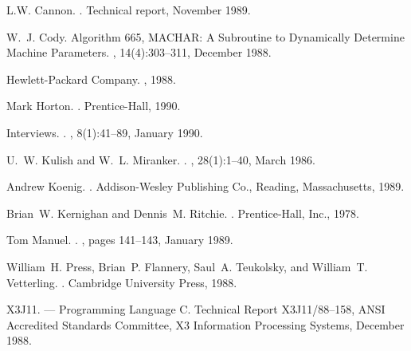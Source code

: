 \begin{thebibliography}{PFTV88}

L.W. Cannon.
.
\newblock Technical report, November 1989.

W.~J. Cody.
\newblock Algorithm 665, {MACHAR: A Subroutine to Dynamically Determine Machine
  Parameters}.
, 14(4):303--311,
  December 1988.

Hewlett-Packard Company.
, 1988.

Mark Horton.
.
\newblock Prentice-Hall, 1990.

Interviews.
.
, 8(1):41--89, January 1990.

U.~W. Kulish and W.~L. Miranker.
.
, 28(1):1--40, March 1986.

Andrew Koenig.
.
\newblock Addison-Wesley Publishing Co., Reading, Massachusetts, 1989.

Brian~W. Kernighan and Dennis~M. Ritchie.
.
\newblock Prentice-Hall, Inc., 1978.

Tom Manuel.
.
, pages 141--143, January 1989.

William~H. Press, Brian~P. Flannery, Saul~A. Teukolsky, and William~T.
  Vetterling.
.
\newblock Cambridge University Press, 1988.

{X3J11}.
  --- {Programming Language C}.
\newblock Technical Report {X3J11/88--158}, {ANSI Accredited Standards
  Committee, X3 Information Processing Systems}, December 1988.

\end{thebibliography}


